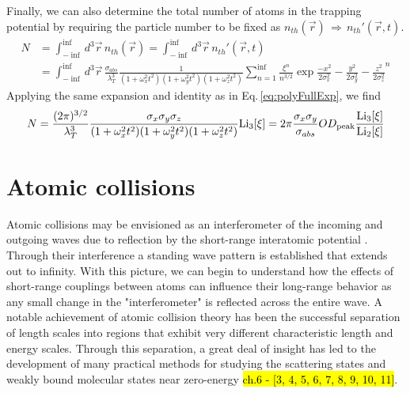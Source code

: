 Finally, we can also determine the total number of atoms in the trapping potential by requiring the particle number to be fixed as $n_{th}(\vec{r})\,\Rightarrow\,n_{th}'(\vec{r},t)$.
\begin{equation}
\begin{split}
	N&=\int_{-\inf}^{\inf} d^3\vec{r}\, n_{th}(\vec{r}) = \int_{-\inf}^{\inf} d^3\vec{r}\, n_{th}'(\vec{r},t) \\
&=\int_{-\inf}^{\inf} d^3\vec{r}\, \frac{\sigma_{abs}}{\lambda_T^3}\frac{1}{(1+\omega_x^2t^2)(1+\omega_y^2t^2)(1+\omega_z^2t^2)} \sum_{n=1}^{\inf} \frac{\xi^n}{n^{3/2}} \exp{\frac{-x^2}{2\sigma_x^2} - \frac{y^2}{2\sigma_y^2} - \frac{z^2}{2\sigma_z^2}}^n
\end{split}
\end{equation}
Applying the same expansion and identity as in Eq.\,\ref{eq:polyFullExp}, we find
\begin{equation}
	N=\frac{(2\pi)^{3/2}}{\lambda_T^3} \frac{\sigma_x \sigma_y \sigma_z}{(1+\omega_x^2t^2)(1+\omega_y^2t^2)(1+	\omega_z^2t^2)} \text{Li}_{3}\!\left[ \xi \right] 
	= 2\pi \frac{\sigma_x \sigma_y}{\sigma_{abs}} OD_{\text{peak}}\frac{\text{Li}_{3}\!\left[ \xi \right]}{\text{Li}_{2}\!\left[ \xi \right]}
\end{equation}

\section{Atomic collisions} \label{sec:cold_collisions}
Atomic collisions may be envisioned as an interferometer of the incoming and outgoing waves due to reflection by the short-range interatomic potential \cite{Jones2006}.
Through their interference a standing wave pattern is established that extends out to infinity.
With this picture, we can begin to understand how the effects of short-range couplings between atoms can influence their long-range behavior as any small change in the "interferometer" is reflected across the entire wave. 
A notable achievement of atomic collision theory has been the successful separation of length scales into regions that exhibit very different characteristic length and energy scales.
Through this separation, a great deal of insight has led to the development of many practical methods for studying the scattering states and weakly bound molecular states near zero-energy \hl{ch.6 - [3, 4, 5, 6, 7, 8, 9, 10, 11]}.

